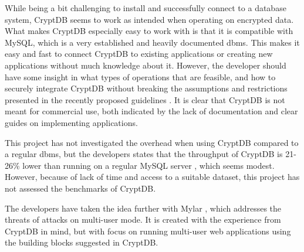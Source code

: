 While being a bit challenging to install and successfully connect to a database system, CryptDB seems to work as intended when operating on encrypted data. What makes CryptDB especially easy to work with is that it is compatible with MySQL, which is a very established and heavily documented \gls{dbms}. This makes it easy and fast to connect CryptDB to existing applications or creating new applications without much knowledge about it. However, the developer should have some insight in what types of operations that are feasible, and how to securely integrate CryptDB without breaking the assumptions and restrictions presented in the recently proposed guidelines \cite{cryptdb_guidelines}. It is clear that CryptDB is not meant for commercial use, both indicated by the lack of documentation and clear guides on implementing applications.

This project has not investigated the overhead when using CryptDB compared to a regular \gls{dbms}, but the developers states that the throughput of CryptDB is 21-26\% lower than running on a regular MySQL server \citep{CryptDB_Main_Paper}, which seems modest. However, because of lack of time and access to a suitable dataset, this project has not assessed the benchmarks of CryptDB.

The developers have taken the idea further with Mylar \cite{mylar_homepage}, which addresses the threats of attacks on multi-user mode. It is created with the experience from CryptDB in mind, but with focus on running multi-user web applications using the building blocks suggested in CryptDB.